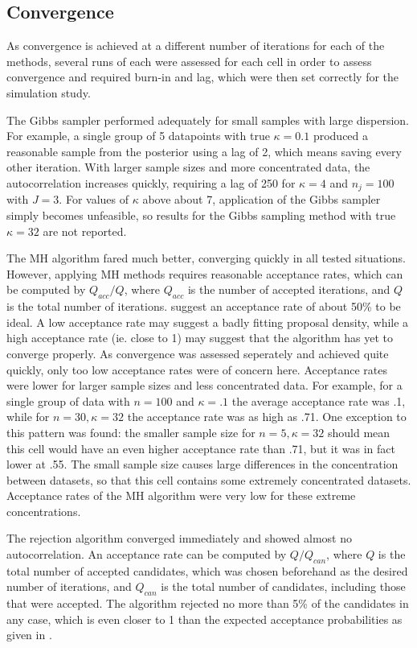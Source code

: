 \documentclass[]{gSCS2e}
\theoremstyle{plain}
\theoremstyle{definition}
\theoremstyle{remark}
\begin{document}
\subsection{Convergence} \label{convergence}

As convergence is achieved at a different number of iterations for each of the methods, several runs of each were assessed for each cell in order to assess convergence and required burn-in and lag, which were then set correctly for the simulation study. 

The Gibbs sampler performed adequately for small samples with large dispersion. For example, a single group of 5 datapoints with true $\kappa = 0.1$ produced a reasonable sample from the posterior using a lag of 2, which means saving every other iteration. With larger sample sizes and more concentrated data, the autocorrelation increases quickly, requiring a lag of 250 for $\kappa = 4$ and $n_j = 100$ with $J=3$. For values of $\kappa$ above about 7, application of the Gibbs sampler simply becomes unfeasible, so results for the Gibbs sampling method with true $\kappa=32$ are not reported. 

The MH algorithm fared much better, converging quickly in all tested situations. However, applying MH methods requires reasonable acceptance rates, which can be computed by $Q_{acc}/Q$, where $Q_{acc}$ is the number of accepted iterations, and $Q$ is the total number of iterations. \citet{johnson1999ordinal} suggest an acceptance rate of about 50\% to be ideal. A low acceptance rate may suggest a badly fitting proposal density, while a high acceptance rate (ie. close to 1) may suggest that the algorithm has yet to converge properly. As convergence was assessed seperately and achieved quite quickly, only too low acceptance rates were of concern here. Acceptance rates were lower for larger sample sizes and less concentrated data. For example, for a single group of data with $n=100$ and $ \kappa=.1$ the average acceptance rate was .1, while for $n=30, \kappa=32$ the acceptance rate was as high as .71. One exception to this pattern was found: the smaller sample size for $n=5, \kappa=32$ should mean this cell would have an even higher acceptance rate than .71, but it was in fact lower at .55. The small sample size causes large differences in the concentration between datasets, so that this cell contains some extremely concentrated datasets. Acceptance rates of the MH algorithm were very low for these extreme concentrations. 

The rejection algorithm converged immediately and showed almost no autocorrelation. An acceptance rate can be computed by $Q/Q_{can}$, where $Q$ is the total number of accepted candidates, which was chosen beforehand as the desired number of iterations, and $Q_{can}$ is the total number of candidates, including those that were accepted. The algorithm rejected no more than 5\% of the candidates in any case, which is even closer to 1 than the expected acceptance probabilities as given in \citet{forbes2014fast}. 
\end{document}
